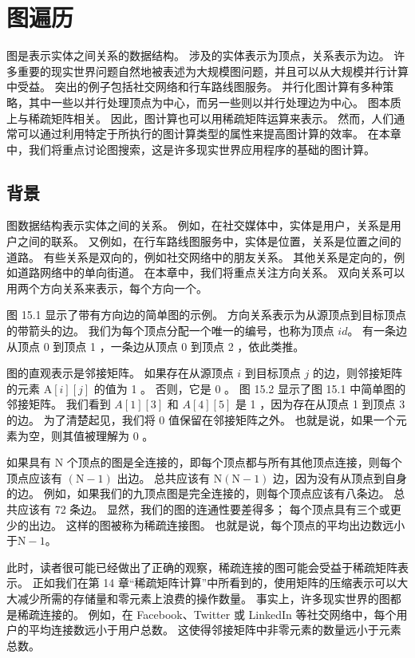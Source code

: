 \section{图遍历}
图是表示实体之间关系的数据结构。 涉及的实体表示为顶点，关系表示为边。 许多重要的现实世界问题自然地被表述为大规模图问题，并且可以从大规模并行计算中受益。 突出的例子包括社交网络和行车路线图服务。 并行化图计算有多种策略，其中一些以并行处理顶点为中心，而另一些则以并行处理边为中心。 图本质上与稀疏矩阵相关。 因此，图计算也可以用稀疏矩阵运算来表示。 然而，人们通常可以通过利用特定于所执行的图计算类型的属性来提高图计算的效率。 在本章中，我们将重点讨论图搜索，这是许多现实世界应用程序的基础的图计算。

\subsection{背景}
图数据结构表示实体之间的关系。 例如，在社交媒体中，实体是用户，关系是用户之间的联系。 又例如，在行车路线图服务中，实体是位置，关系是位置之间的道路。 有些关系是双向的，例如社交网络中的朋友关系。 其他关系是定向的，例如道路网络中的单向街道。 在本章中，我们将重点关注方向关系。 双向关系可以用两个方向关系来表示，每个方向一个。

图 15.1 显示了带有方向边的简单图的示例。 方向关系表示为从源顶点到目标顶点的带箭头的边。 我们为每个顶点分配一个唯一的编号，也称为顶点 $i d$。 有一条边从顶点 0 到顶点 1 ，一条边从顶点 0 到顶点 2 ，依此类推。

图的直观表示是邻接矩阵。 如果存在从源顶点 $i$ 到目标顶点 $j$ 的边，则邻接矩阵的元素 $\mathrm{A}[i][j]$ 的值为 1 。 否则，它是 0 。 图 15.2 显示了图 15.1 中简单图的邻接矩阵。 我们看到 $A[1][3]$ 和 $A[4][5]$ 是 1 ，因为存在从顶点 1 到顶点 3 的边。 为了清楚起见，我们将 0 值保留在邻接矩阵之外。 也就是说，如果一个元素为空，则其值被理解为 0 。

如果具有 $\mathrm{N}$ 个顶点的图是全连接的，即每个顶点都与所有其他顶点连接，则每个顶点应该有 $(\mathrm{N}-1)$ 出边。 总共应该有 $\mathrm{N}(\mathrm{N}-1)$ 边，因为没有从顶点到自身的边。 例如，如果我们的九顶点图是完全连接的，则每个顶点应该有八条边。 总共应该有 72 条边。 显然，我们的图的连通性要差得多； 每个顶点具有三个或更少的出边。 这样的图被称为稀疏连接图。 也就是说，每个顶点的平均出边数远小于$\mathrm{N}-1$。

此时，读者很可能已经做出了正确的观察，稀疏连接的图可能会受益于稀疏矩阵表示。 正如我们在第 14 章“稀疏矩阵计算”中所看到的，使用矩阵的压缩表示可以大大减少所需的存储量和零元素上浪费的操作数量。 事实上，许多现实世界的图都是稀疏连接的。 例如，在 Facebook、Twitter 或 LinkedIn 等社交网络中，每个用户的平均连接数远小于用户总数。 这使得邻接矩阵中非零元素的数量远小于元素总数。

